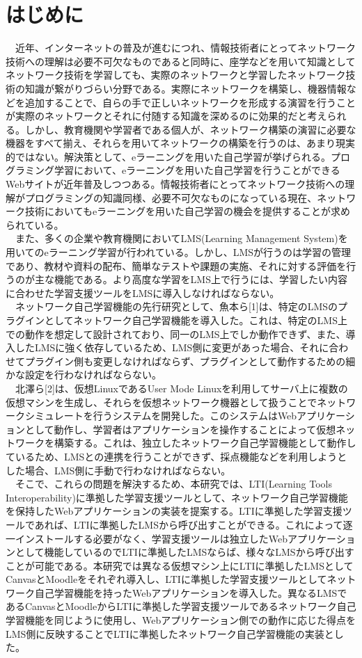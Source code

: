 \section{はじめに}
\label{tag:first}
　近年、インターネットの普及が進むにつれ、情報技術者にとってネットワーク技術への理解は必要不可欠なものであると同時に、座学などを用いて知識としてネットワーク技術を学習しても、実際のネットワークと学習したネットワーク技術の知識が繋がりづらい分野である。実際にネットワークを構築し、機器情報などを追加することで、自らの手で正しいネットワークを形成する演習を行うことが実際のネットワークとそれに付随する知識を深めるのに効果的だと考えられる。しかし、教育機関や学習者である個人が、ネットワーク構築の演習に必要な機器をすべて揃え、それらを用いてネットワークの構築を行うのは、あまり現実的ではない。解決策として、eラーニングを用いた自己学習が挙げられる。プログラミング学習において、eラーニングを用いた自己学習を行うことができるWebサイトが近年普及しつつある。情報技術者にとってネットワーク技術への理解がプログラミングの知識同様、必要不可欠なものになっている現在、ネットワーク技術においてもeラーニングを用いた自己学習の機会を提供することが求められている。\\
　また、多くの企業や教育機関においてLMS(Learning Management System)を用いてのeラーニング学習が行われている。しかし、LMSが行うのは学習の管理であり、教材や資料の配布、簡単なテストや課題の実施、それに対する評価を行うのが主な機能である。より高度な学習をLMS上で行うには、学習したい内容に合わせた学習支援ツールをLMSに導入しなければならない。\\
　ネットワーク自己学習機能の先行研究として、魚本ら[1]は、特定のLMSのプラグインとしてネットワーク自己学習機能を導入した。これは、特定のLMS上での動作を想定して設計されており、同一のLMS上でしか動作できず、また、導入したLMSに強く依存しているため、LMS側に変更があった場合、それに合わせてプラグイン側も変更しなければならず、プラグインとして動作するための細かな設定を行わなければならない。\\
　北澤ら[2]は、仮想LinuxであるUser Mode Linuxを利用してサーバ上に複数の仮想マシンを生成し、それらを仮想ネットワーク機器として扱うことでネットワークシミュレートを行うシステムを開発した。このシステムはWebアプリケーションとして動作し、学習者はアプリケーションを操作することによって仮想ネットワークを構築する。これは、独立したネットワーク自己学習機能として動作しているため、LMSとの連携を行うことができず、採点機能などを利用しようとした場合、LMS側に手動で行わなければならない。\\
　そこで、これらの問題を解決するため、本研究では、LTI(Learning Tools Interoperability)に準拠した学習支援ツールとして、ネットワーク自己学習機能を保持したWebアプリケーションの実装を提案する。LTIに準拠した学習支援ツールであれば、LTIに準拠したLMSから呼び出すことができる。これによって逐一インストールする必要がなく、学習支援ツールは独立したWebアプリケーションとして機能しているのでLTIに準拠したLMSならば、様々なLMSから呼び出すことが可能である。本研究では異なる仮想マシン上にLTIに準拠したLMSとしてCanvasとMoodleをそれぞれ導入し、LTIに準拠した学習支援ツールとしてネットワーク自己学習機能を持ったWebアプリケーションを導入した。異なるLMSであるCanvasとMoodleからLTIに準拠した学習支援ツールであるネットワーク自己学習機能を同じように使用し、Webアプリケーション側での動作に応じた得点をLMS側に反映することでLTIに準拠したネットワーク自己学習機能の実装とした。\\
